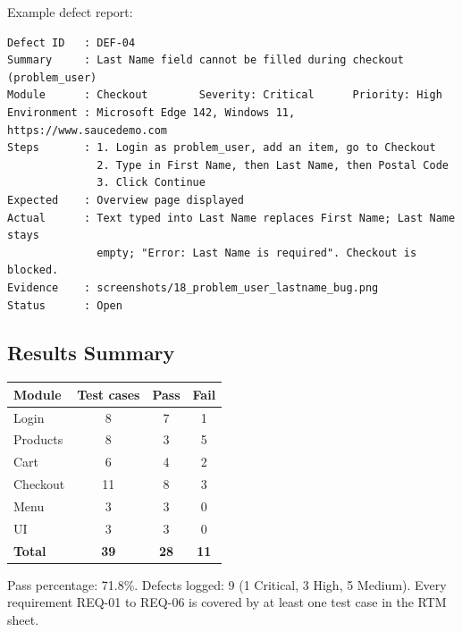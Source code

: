 \documentclass[12pt,a4paper]{article}
\begin{document}
Example defect report:
\begin{lstlisting}
Defect ID   : DEF-04
Summary     : Last Name field cannot be filled during checkout (problem_user)
Module      : Checkout        Severity: Critical      Priority: High
Environment : Microsoft Edge 142, Windows 11, https://www.saucedemo.com
Steps       : 1. Login as problem_user, add an item, go to Checkout
              2. Type in First Name, then Last Name, then Postal Code
              3. Click Continue
Expected    : Overview page displayed
Actual      : Text typed into Last Name replaces First Name; Last Name stays
              empty; "Error: Last Name is required". Checkout is blocked.
Evidence    : screenshots/18_problem_user_lastname_bug.png
Status      : Open
\end{lstlisting}

\subsection{Results Summary}\label{sec:work3}
\begin{center}
\renewcommand{\arraystretch}{1.3}
\begin{tabular}{|l|c|c|c|}
\hline
\textbf{Module} & \textbf{Test cases} & \textbf{Pass} & \textbf{Fail}\\ \hline
Login & 8 & 7 & 1\\ \hline
Products & 8 & 3 & 5\\ \hline
Cart & 6 & 4 & 2\\ \hline
Checkout & 11 & 8 & 3\\ \hline
Menu & 3 & 3 & 0\\ \hline
UI & 3 & 3 & 0\\ \hline
\textbf{Total} & \textbf{39} & \textbf{28} & \textbf{11}\\ \hline
\end{tabular}
\end{center}
Pass percentage: 71.8\%. Defects logged: 9 (1 Critical, 3 High, 5 Medium). Every requirement REQ-01 to REQ-06 is covered by at least one test case in the RTM sheet.

\end{document}
